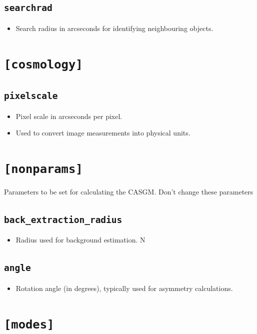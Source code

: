 \documentclass[11pt]{article}
\begin{document}
\subsection{\texttt{searchrad}}
\begin{itemize}
\item Search radius in arcseconds for identifying neighbouring objects.
\end{itemize}


\section{\texttt{[cosmology]}}

\subsection{\texttt{pixelscale}}
\begin{itemize}
\item Pixel scale in arcseconds per pixel.
\item Used to convert image measurements into physical units.
\end{itemize}

\section{\texttt{[nonparams]}}

Parameters to be set for calculating the CASGM. Don't change these parameters

\subsection{\texttt{back\_extraction\_radius}}
\begin{itemize}
\item Radius used for background estimation. N
\end{itemize}

\subsection{\texttt{angle}}
\begin{itemize}
\item Rotation angle (in degrees), typically used for asymmetry calculations.
\end{itemize}

\section{\texttt{[modes]}}
\end{document}
